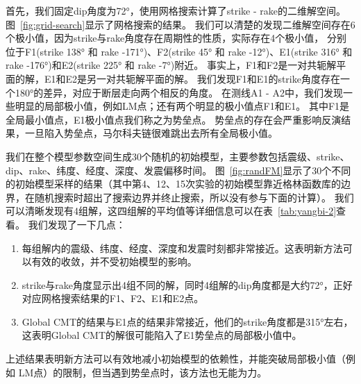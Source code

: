 首先，我们固定dip角度为72°，使用网格搜索计算了strike - rake的二维解空间。
图~\ref{fig:grid-search}显示了网格搜索的结果。
我们可以清楚的发现二维解空间存在6个极小值，因为strike与rake角度存在周期性的性质，实际存在4个极小值，
分别位于F1(strike 138° 和 rake -171°)、F2(strike 45° 和 rake -12°)、E1(strike 316° 和 rake -176°)和E2(strike 225° 和 rake -7°)附近。
事实上，F1和F2是一对共轭解平面的解，E1和E2是另一对共轭解平面的解。
我们发现F1和E1的strike角度存在一个180°的差异，对应于断层走向两个相反的角度。
在测线A1 - A2中，我们发现一些明显的局部极小值，例如LM点；还有两个明显的极小值点F1和E1。
其中F1是全局最小值点，E1极小值点我们称之为势垒点。
势垒点的存在会严重影响反演结果，一旦陷入势垒点，马尔科夫链很难跳出去所有全局极小值。

我们在整个模型参数空间生成30个随机的初始模型，主要参数包括震级、strike、dip、rake、纬度、经度、深度、发震偏移时间。
图~\ref{fig:randFM}显示了30个不同的初始模型采样的结果（其中第4、12、15次实验的初始模型靠近格林函数库的边界，在随机搜索时超出了搜索边界并终止搜索，所以没有参与下面的计算）。
我们可以清晰发现有4组解，这四组解的平均值等详细信息可以在表~\ref{tab:yangbi-2}查看。
我们发现了一下几点：
\begin{enumerate}
    \item 每组解内的震级、纬度、经度、深度和发震时刻都非常接近。这表明新方法可以有效的收敛，并不受初始模型的影响。
    \item strike与rake角度显示出4组不同的解，同时4组解的dip角度都是大约72°，正好对应网格搜索结果的F1、F2、E1和E2点。
    \item Global CMT的结果与E1点的结果非常接近，他们的strike角度都是315°左右，这表明Global CMT的解很可能陷入了E1势垒点的局部极小值中。
\end{enumerate}

上述结果表明新方法可以有效地减小初始模型的依赖性，并能突破局部极小值（例如 LM点）的限制，但当遇到势垒点时，该方法也无能为力。

